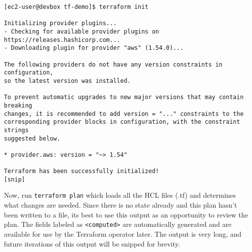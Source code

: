 \begin{verbatim}
[ec2-user@devbox tf-demo]$ terraform init

Initializing provider plugins...
- Checking for available provider plugins on https://releases.hashicorp.com...
- Downloading plugin for provider "aws" (1.54.0)...

The following providers do not have any version constraints in configuration,
so the latest version was installed.

To prevent automatic upgrades to new major versions that may contain breaking
changes, it is recommended to add version = "..." constraints to the
corresponding provider blocks in configuration, with the constraint strings
suggested below.

* provider.aws: version = "~> 1.54"

Terraform has been successfully initialized!
[snip]
\end{verbatim}

Now, run \verb|terraform plan| which loads all the HCL files (.tf) and determines
what changes are needed. Since there is no state already and this plan hasn't
been written to a file, its best to use this output as an opportunity to
review the plan. The fields labeled as \verb|<computed>| are automatically generated
and are available for use by the Terraform operator later. The output is very
long, and future iterations of this output will be snipped for brevity.

